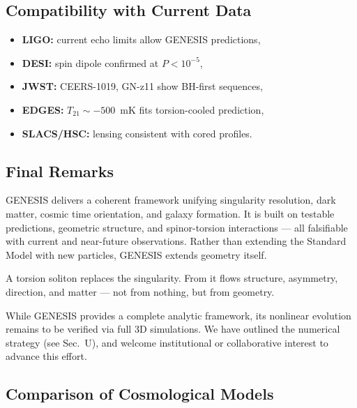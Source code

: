 \documentclass{article}
\begin{document}
\subsection{ Compatibility with Current Data}
\begin{itemize}
  \item \textbf{LIGO:} current echo limits allow GENESIS predictions,
  \item \textbf{DESI:} spin dipole confirmed at $P < 10^{-5}$,
  \item \textbf{JWST:} CEERS-1019, GN-z11 show BH-first sequences,
  \item \textbf{EDGES:} $T_{21} \sim -500$~mK fits torsion-cooled prediction,
  \item \textbf{SLACS/HSC:} lensing consistent with cored profiles.
\end{itemize}

\subsection{ Final Remarks}
GENESIS delivers a coherent framework unifying singularity resolution, dark matter, cosmic time orientation, and galaxy formation. It is built on testable predictions, geometric structure, and spinor-torsion interactions — all falsifiable with current and near-future observations. Rather than extending the Standard Model with new particles, GENESIS extends geometry itself.

\begin{tcolorbox}[colback=gray!5, colframe=black!30, title=The essence of GENESIS]
A torsion soliton replaces the singularity. From it flows structure, asymmetry, direction, and matter — not from nothing, but from geometry.
\end{tcolorbox}

While GENESIS provides a complete analytic framework, its nonlinear evolution remains to be verified via full 3D simulations. We have outlined the numerical strategy (see Sec.~U), and welcome institutional or collaborative interest to advance this effort.


\subsection{ Comparison of Cosmological Models}
\label{sec:model_comparison}
\end{document}
